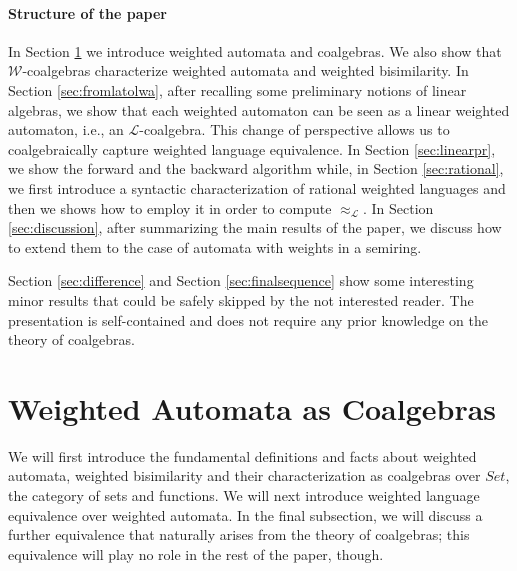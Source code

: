 \documentclass[3p]{elsarticle}
\newcommand{\fW}{\mathcal{W}}    %
\newcommand{\fL}{\mathcal{L}}    %
\newcommand{\mik}[1]{\marginpar{ \textbf{MiB:} {\footnotesize #1}}} %
\begin{document}
\paragraph{Structure of the paper}
%
In Section \ref{sec:coalg} we introduce weighted automata and coalgebras.
We also show that $\fW$-coalgebras characterize weighted automata
and weighted bisimilarity. In Section \ref{sec:fromlatolwa},
after recalling some preliminary notions of linear algebras, we show that
each weighted automaton can be seen as a linear weighted automaton, i.e., an
$\fL$-coalgebra. This change of perspective allows us to coalgebraically capture
weighted language equivalence. In Section \ref{sec:linearpr}, we show the forward
and the backward algorithm while, in Section \ref{sec:rational}, we first introduce a
syntactic characterization of rational weighted languages and then we shows how to
employ it in order to compute $\approx_{\fL}$. In Section \ref{sec:discussion}, after
summarizing the main results of the paper, we discuss how to extend them to the
case of automata with weights in a semiring.

Section \ref{sec:difference} and Section \ref{sec:finalsequence} show some interesting
minor results that could be safely skipped by the not interested reader. The presentation
is self-contained and does not require any prior knowledge on the theory of coalgebras.


\section{Weighted Automata as Coalgebras}\label{sec:coalg}
%
We will first introduce the fundamental definitions and facts about weighted automata, weighted bisimilarity and their
characterization as coalgebras over $Set$, the category of sets and
functions. We will next introduce  weighted language equivalence over weighted automata. In the final subsection, we will discuss a further equivalence that naturally arises from the theory of coalgebras; this equivalence will   play no role in the rest of the paper, though.
\end{document}
